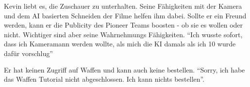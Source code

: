 \begin{npcBox}[title=Kevin\, Kamera]
    \begin{consequences}
    \item {}
    \item {}
    \item {}
    \end{consequences}

    \begin{npcDescription}
    Kevin liebt es, die Zuschauer zu unterhalten. Seine Fähigkeiten mit der Kamera und dem AI basierten Schneiden der Filme helfen ihm dabei. Sollte er ein Freund werden, kann er die Publicity des Pioneer Teams boosten - ob sie es wollen oder nicht. Wichtiger sind aber seine Wahrnehmungs Fähigkeiten.
    \enquote{Ich wusste sofort, dass ich Kameramann werden wollte, als mich die KI damals als ich 10 wurde dafür vorschlug}

    Er hat keinen Zugriff auf Waffen und kann auch keine bestellen. \enquote{Sorry, ich habe das Waffen Tutorial nicht abgeschlossen. Ich kann nichts bestellen}.

    \end{npcDescription}

\end{npcBox}



